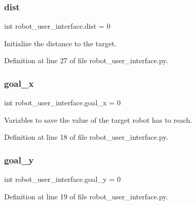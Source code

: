 \subsubsection{\texorpdfstring{dist}{dist}}
{\footnotesize\ttfamily int robot\+\_\+user\+\_\+interface.\+dist = 0}



Initialize the distance to the target. 



Definition at line 27 of file robot\+\_\+user\+\_\+interface.\+py.

\mbox{\label{namespacerobot__user__interface_aa49c4c4b4c031611deca926a34deb345}} 
\subsubsection{\texorpdfstring{goal\+\_\+x}{goal\_x}}
{\footnotesize\ttfamily int robot\+\_\+user\+\_\+interface.\+goal\+\_\+x = 0}



Variables to save the value of the target robot has to reach. 



Definition at line 18 of file robot\+\_\+user\+\_\+interface.\+py.

\mbox{\label{namespacerobot__user__interface_aee93dc3e48f178d62b1209aa13232be2}} 
\subsubsection{\texorpdfstring{goal\+\_\+y}{goal\_y}}
{\footnotesize\ttfamily int robot\+\_\+user\+\_\+interface.\+goal\+\_\+y = 0}



Definition at line 19 of file robot\+\_\+user\+\_\+interface.\+py.

\mbox{\label{namespacerobot__user__interface_ab96d4afbc6f7d4bb5019beec53e4615d}} 
